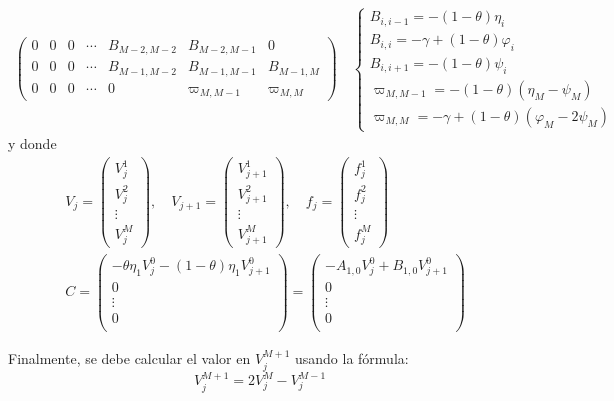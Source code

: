 \begin{align*}
{\begin{pmatrix}
            0 & 0 & 0 & \cdots & B_{M-2,M-2} & B_{M-2,M-1} & 0 \\
            0 & 0 & 0 & \cdots & B_{M-1,M-2} & B_{M-1,M-1} & B_{M-1,M} \\
            0 & 0 & 0 & \cdots & 0  & \varpi_{M,M-1} & \varpi_{M,M}
        \end{pmatrix}
        \quad \begin{cases}
            B_{i,i-1} = -(1-\theta)\eta_i \\
            B_{i,i} = -\gamma + (1-\theta) \varphi_i \\
            B_{i,i+1} = -(1-\theta)\psi_i \\
            \varpi_{M,M-1} = -(1-\theta)(\eta_M - \psi_M) \\
            \varpi_{M,M} = -\gamma + (1-\theta) (\varphi_M - 2\psi_M)
        \end{cases}
    }
\end{align*}
y donde
\begin{align*}
    &\boxed{
        V_j = \begin{pmatrix}
            V_j^1 \\
            V_j^2 \\
            \vdots \\
            V_j^M
        \end{pmatrix}, \quad
        V_{j+1} = \begin{pmatrix}
            V_{j+1}^1 \\
            V_{j+1}^2 \\
            \vdots \\
            V_{j+1}^M
        \end{pmatrix}, \quad
        f_j = \begin{pmatrix}
            f_j^1 \\
            f_j^2 \\
            \vdots \\
            f_j^M
        \end{pmatrix}
    } \\
    &\boxed{
        C = \begin{pmatrix}
            -\theta\eta_1 V_j^{0} - (1-\theta)\eta_1 V_{j+1}^{0} \\
            0 \\
            \vdots \\
            0 \\
        \end{pmatrix}
        = \begin{pmatrix}
            -A_{1,0}V_j^{0} + B_{1,0}V_{j+1}^{0} \\
            0 \\
            \vdots \\
            0 \\
        \end{pmatrix}
    }
\end{align*}

Finalmente, se debe calcular el valor en $V_j^{M+1}$ usando la fórmula:
\begin{equation*}
    \boxed{V_j^{M+1} = 2V_j^{M} - V_j^{M-1}}
\end{equation*}











